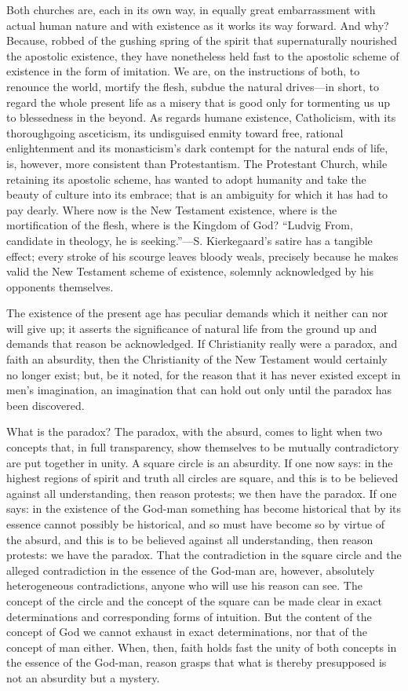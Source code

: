 \documentclass[12pt,a4paper,openany]{book}
\newcommand{\opage}[1]{\marginnote{\footnotesize\textit{[#1]}}}
\begin{document}
Both churches are, each in its own way, in equally great embarrassment
with actual human nature and with existence as it works its way forward.
And why? Because, robbed of the gushing spring of the spirit that
supernaturally nourished the apostolic existence, they have nonetheless
held fast to the apostolic scheme of existence in the form of imitation.
We are, on the instructions of both, to renounce the world, mortify the
flesh, subdue the natural drives---in short, to regard the whole present
life as a misery that is good only for tormenting us up to blessedness in
the beyond. As regards humane existence, Catholicism, with its
thoroughgoing asceticism, its undisguised enmity toward free, rational
enlightenment and its monasticism's dark contempt for the natural ends
of life, is, however, more consistent \opage{80}than Protestantism. The Protestant
Church, while retaining its apostolic scheme, has wanted to adopt
humanity and take the beauty of culture into its embrace; that is an
ambiguity for which it has had to pay dearly. Where now is the New
Testament existence, where is the mortification of the flesh, where is
the Kingdom of God? ``Ludvig From, candidate in theology, he is
seeking.''---S. Kierkegaard's satire has a tangible effect; every stroke
of his scourge leaves bloody weals, precisely because he makes valid the
New Testament scheme of existence, solemnly acknowledged by his opponents
themselves.

The existence of the present age has peculiar demands which it neither
can nor will give up; it asserts the significance of natural life from
the ground up and demands that reason be acknowledged. If Christianity
really were a paradox, and faith an absurdity, then the Christianity of
the New Testament would certainly no longer exist; but, be it noted, for
the reason that it has never existed except in men's imagination, an
imagination that can hold out only until the paradox has been discovered.

What is the paradox? The paradox, with the absurd, comes to light when
two concepts that, in full transparency, show themselves to be mutually
contradictory are put together in unity. A square circle is an
absurdity. If one now says: in the highest regions of spirit and truth
all circles are square, and this is to be believed against all
understanding, then reason protests; we then have the paradox. If one
says: in the existence of the God-man something has become historical
that by its essence cannot possibly be historical, and so must have
become so by virtue of the absurd, and this is to be \opage{81}believed against all
understanding, then reason protests: we have the paradox. That the
contradiction in the square circle and the alleged contradiction in the
essence of the God-man are, however, absolutely heterogeneous
contradictions, anyone who will use his reason can see. The concept of
the circle and the concept of the square can be made clear in exact
determinations and corresponding forms of intuition. But the content of
the concept of God we cannot exhaust in exact determinations, nor that of
the concept of man either. When, then, faith holds fast the unity of both
concepts in the essence of the God-man, reason grasps that what is
thereby presupposed is not an absurdity but a mystery.
\end{document}
